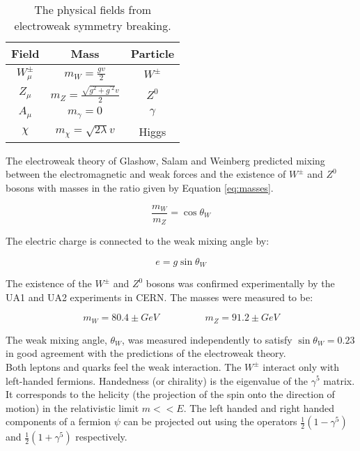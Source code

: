 \begin{table}
\begin{center}
\begin{tabular}{|c|c|c|}
\hline
Field & Mass & Particle \\
\hline
$W_{\mu}^{\pm}$ & $m_{W} = \frac{gv}{2}$ & $W^{\pm}$ \\
$Z_{\mu}$ & $m_{Z} = \frac{\sqrt{g^{2} + g^{\prime 2}}v}{2}$ & $Z^{0}$ \\
$A_{\mu}$ & $m_{\gamma} = 0$ & $\gamma$ \\
$\chi$ & $m_{\chi} = \sqrt{2\lambda}v$ & Higgs \\
\hline
\end{tabular}
\end{center}
\caption{The physical fields from electroweak symmetry breaking.}
\label{tab:physical}
\end{table} 

The electroweak theory of Glashow, Salam and Weinberg predicted mixing between
the electromagnetic and weak forces and the existence of $W^{\pm}$ and $Z^{0}$ 
bosons with masses in the ratio given by Equation \ref{eq:masses}. 

\begin{equation}
\frac{m_{W}}{m_{Z}} = \cos\theta_{W}
\label{eq:masses}
\end{equation}

The electric charge is connected to the weak mixing angle by:

\begin{equation}
e = g\sin\theta_{W}
\end{equation}

The existence of the $W^{\pm}$ and $Z^{0}$ bosons was confirmed experimentally 
by the UA1 and UA2 experiments in CERN. The masses were measured to be:

\begin{equation}
m_{W} = 80.4\pm \unit{GeV} \hspace{2cm} m_{Z} = 91.2\pm \unit{GeV}
\end{equation}

The weak mixing angle, $\theta_{W}$, was measured independently to satisfy 
$\sin\theta_{W} = 0.23$ in good agreement with the predictions of the
electroweak theory. \\

Both leptons and quarks feel the weak interaction. The $W^{\pm}$ interact only
with left-handed fermions. Handedness (or chirality) is the eigenvalue of the 
$\gamma^{5}$ matrix. It corresponds to the helicity (the projection of the spin 
onto the direction of motion) in the relativistic limit $m << E$. The left
handed and right handed components of a fermion $\psi$ can be projected out
using the operators $\frac{1}{2}(1 - \gamma^{5})$ and $\frac{1}{2}(1 + 
\gamma^{5})$ respectively. \\

